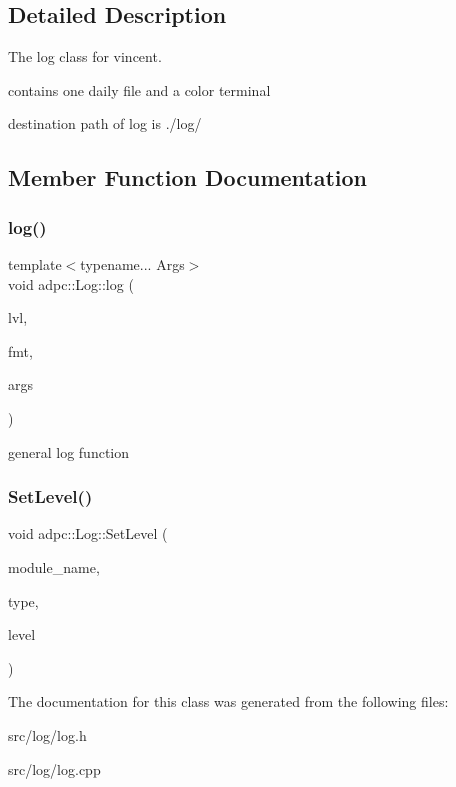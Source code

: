 \subsection{Detailed Description}
The log class for vincent. 

contains one daily file and a color terminal

destination path of log is ./log/ 

\subsection{Member Function Documentation}
\mbox{\label{classadpc_1_1Log_ae3e21b4038776f15d0b5ebdfebc41f57}} 
\subsubsection{\texorpdfstring{log()}{log()}}
{\footnotesize\ttfamily template$<$typename... Args$>$ \\
void adpc\+::\+Log\+::log (\begin{DoxyParamCaption}\item[{\hyperlink{log__config_8h_a172986fa5f658c5fe0b42bd954e9e133}{Log\+Level}}]{lvl,  }\item[{const char $\ast$}]{fmt,  }\item[{const Args \&...}]{args }\end{DoxyParamCaption})\hspace{0.3cm}{\ttfamily [inline]}}

general log function \mbox{\label{classadpc_1_1Log_a2e8bf1e2c8ac8381be9022df60530f87}} 
\subsubsection{\texorpdfstring{Set\+Level()}{SetLevel()}}
{\footnotesize\ttfamily void adpc\+::\+Log\+::\+Set\+Level (\begin{DoxyParamCaption}\item[{const string \&}]{module\+\_\+name,  }\item[{const Log\+Sink\+Type}]{type,  }\item[{const \hyperlink{log__config_8h_a172986fa5f658c5fe0b42bd954e9e133}{Log\+Level}}]{level }\end{DoxyParamCaption})\hspace{0.3cm}{\ttfamily [inline]}}



The documentation for this class was generated from the following files\+:\begin{DoxyCompactItemize}
\item 
src/log/log.\+h\item 
src/log/log.\+cpp\end{DoxyCompactItemize}
